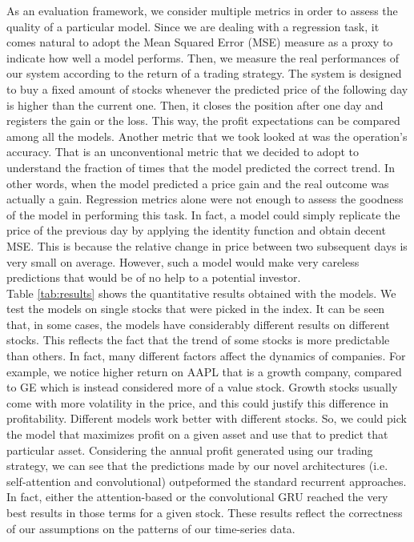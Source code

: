 \documentclass{article}
\begin{document}
As an evaluation framework, we consider multiple metrics in order to assess the quality
of a particular model. Since we are dealing with a regression task, it comes natural
to adopt the Mean Squared Error (MSE) measure as a proxy to indicate how well a model
performs. Then, we measure the real performances
of our system according to the return of a trading strategy. The system is
designed to buy a fixed amount of stocks whenever the predicted price of
the following day is higher than the current one. Then, it closes the position after one
day and registers the gain or the loss. This way, the profit expectations can be compared
among all the models. Another metric that we took looked at was the operation's
accuracy. That is an unconventional metric that we decided to adopt to understand the
fraction of times that the model predicted the correct trend. In other words, when the model
predicted a price gain and the real outcome was actually a gain.
Regression metrics alone were not enough
to assess the goodness of the model in performing this task. In fact, a model could
simply replicate the price of the previous day by applying the identity function and obtain
decent MSE. This is because the relative change in price between two subsequent days is
very small on average. However, such a model would make very careless predictions that
would be of no help to a potential investor. \\
Table \ref{tab:results} shows the quantitative results obtained with the models.
We test the models on single stocks that were picked in the index. It can be seen that, in some cases,
the models have considerably different results on different stocks. This reflects the fact that the trend
of some stocks is more predictable than others. In fact, many different factors affect the dynamics of companies.
For example, we notice higher return on AAPL that is a growth company, compared to GE which is instead
considered more of a value stock. Growth stocks usually come with more volatility in the price, and this could
justify this difference in profitability. Different models work better with different stocks. So,
we could pick the model that maximizes profit on a given asset and use that to predict
that particular asset.
Considering the annual profit generated using our trading strategy,
we can see that the predictions made by our novel architectures (i.e. self-attention
and convolutional) outpeformed the standard recurrent approaches. In fact, either the attention-based
or the convolutional GRU reached the very best results in those terms for a given stock.
These results reflect the correctness of our assumptions on the patterns of our time-series data.
\end{document}
